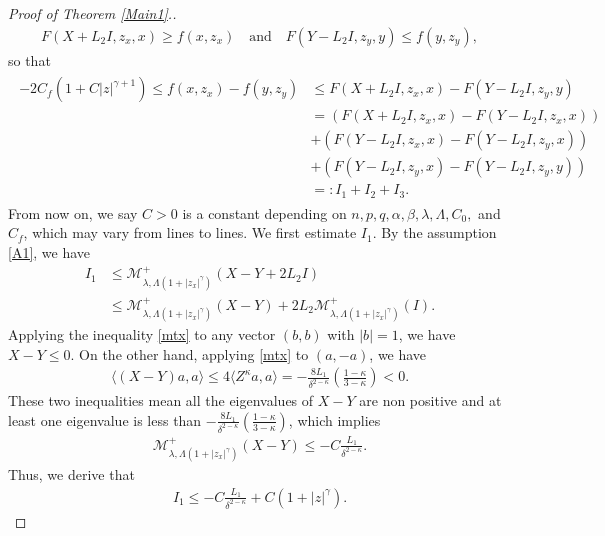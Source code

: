 \documentclass[reqno]{amsart}
\theoremstyle{plain}
\theoremstyle{definition}
\theoremstyle{remark}
\numberwithin{equation}{section}
\begin{document}
\begin{proof}[Proof of Theorem \ref{Main1}.]
     \begin{align*}
         F(X+L_2I, z_x, x) \geq f(x,z_x) \quad \text{and} \quad F(Y-L_2I, z_y, y) \leq f(y,z_y),
     \end{align*}
     so that
     \begin{align} \label{allest}
     \begin{split}
         -2C_f(1+C|z|^{\gamma+1})\leq f(x,z_x)-f(y,z_y) 
         &\leq F(X+L_2I, z_x, x) -F(Y-L_2I, z_y, y) \\
        &=(F(X+L_2 I ,z_x, x) - F(Y-L_2 I , z_x, x)) \\
        &+ (F(Y-L_2 I , z_x, x) - F(Y-L_2I, z_y, x)) \\
        &+ (F(Y-L_2I, z_y, x) - F(Y-L_2I, z_y, y)) \\
        &=:I_1 + I_2 +I_3.
     \end{split}
     \end{align}
     From now on, we say $C>0$ is a constant depending on $n, p, q, \alpha, \beta, \lambda, \Lambda, C_0,$ and $ C_f$, which may vary from lines to lines.
     We first estimate $I_1$.
     By the assumption \ref{A1}, we have
     \begin{align*}
         I_1 &\leq \mathcal{M}^+_{\lambda, \Lambda(1+|z_x|^{\gamma})}(X-Y+2L_2I) \\
         &\leq \mathcal{M}^+_{\lambda, \Lambda(1+|z_x|^{\gamma} )}(X-Y) +2L_2\mathcal{M}^+_{\lambda, \Lambda(1+|z_x|^{\gamma})}(I).
     \end{align*}
     Applying the inequality \eqref{mtx} to any vector $(b,b)$ with $|b|= 1$, we have $X-Y \leq 0$.
     On the other hand, applying \eqref{mtx} to $(a,-a)$, we have
     \begin{align*}
         \langle(X-Y)a,a\rangle \leq 4\langle Z^\kappa a, a\rangle = -\frac{8L_1}{\delta^{2-\kappa}} \left(\frac{1-\kappa}{3-\kappa}\right) <0.
     \end{align*}
     These two inequalities mean all the eigenvalues of $X-Y$ are non positive and at least one eigenvalue is less than $-\frac{8L_1}{\delta^{2-\kappa}} \left(\frac{1-\kappa}{3-\kappa}\right)$,
     which implies
     \begin{align*}
         \mathcal{M}^+_{\lambda, \Lambda(1+|z_x|^{\gamma})}(X-Y) \leq -C\frac{L_1}{\delta^{2-\kappa}}.
     \end{align*}
     Thus, we derive that
     \begin{align*}
         I_1 \leq -C\frac{L_1}{\delta^{2-\kappa}} + C(1+|z|^\gamma).
     \end{align*}

\end{proof}
\end{document}

